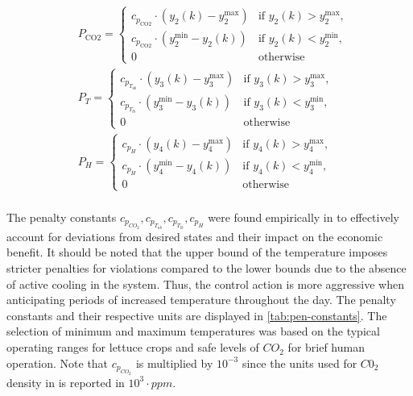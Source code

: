 \begin{equation}
\begin{aligned}
& P_{\text{CO2}} = 
\begin{cases} 
c_{p_{\text{CO2}}} \cdot (y_2(k) - y_2^{\text{max}}) & \text{if } y_2(k) > y_2^{\text{max}} , \\
c_{p_{\text{CO2}}} \cdot (y_2^{\text{min}} - y_2(k)) & \text{if } y_2(k) < y_2^{\text{min}} , \\
0 & \text{otherwise}
\end{cases}
\\
& P_{T} = 
\begin{cases} 
c_{p_{T_{ub}}} \cdot (y_3(k) - y_3^{\text{max}}) & \text{if } y_3(k) > y_3^{\text{max}} , \\
c_{p_{T_{lb}}} \cdot (y_3^{\text{min}} - y_3(k)) & \text{if } y_3(k) < y_3^{\text{min}} , \\
0 & \text{otherwise}
\end{cases}
\\
& P_{H} = 
\begin{cases} 
c_{p_{H}} \cdot (y_4(k) - y_4^{\text{max}}) & \text{if } y_4(k) > y_4^{\text{max}} , \\
c_{p_{H}} \cdot (y_4^{\text{min}} - y_4(k)) & \text{if } y_4(k) < y_4^{\text{min}} , \\
0 & \text{otherwise}
\end{cases}
\\
\end{aligned}
\end{equation}

The penalty constants $c_{p_{CO_2}}, c_{p_{T_{ub}}},c_{p_{T_{lb}}},c_{p_{H}}$ were found empirically in \citet{jansenOptimalControlLettuce2023} to effectively account for deviations from desired states and their impact on the economic benefit. It should be noted that the upper bound of the temperature imposes stricter penalties for violations compared to the lower bounds due to the absence of active cooling in the system. Thus, the control action is more aggressive when anticipating periods of increased temperature throughout the day. The penalty constants and their respective units are displayed in \autoref{tab:pen-constants}. The selection of minimum and maximum temperatures was based on the typical operating ranges for lettuce crops and  safe levels of $CO_2$ for brief human operation. Note that $c_{p_{CO_2}}$ is multiplied by $10^{-3}$ since the units used for $C0_2$ density in \citet{jansenOptimalControlLettuce2023} is reported in $10^3 \cdot ppm$.

